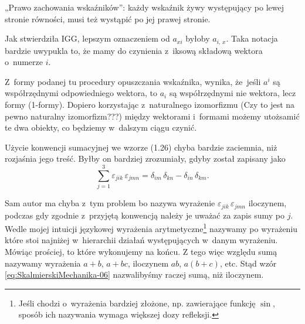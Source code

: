 \documentclass[a4paper,11pt]{article}
\begin{document}
„Prawo zachowania wskaźników”: każdy wskaźnik żywy występujący po lewej
stronie równości, musi też wystąpić po jej prawej stronie.

\vspace{\spaceFour}



 Jak stwierdziła IGG, lepszym oznaczeniem od $a_{ xi }$ byłoby
$a_{ i,\, x }$. Taka notacja bardzie uwypukla to, że mamy do czynienia
z~iksową składową wektora o~numerze $i$.

\vspace{\spaceFour}



 Z~formy podanej tu procedury opuszczania wskaźnika, wynika,
że~jeśli $a^{ i }$ są współrzędnymi odpowiedniego wektora, to $a_{ i }$ są
współrzędnymi nie wektora, lecz formy (1-formy). Dopiero korzystając
z~naturalnego izomorfizmu (Czy to jest na pewno naturalny izomorfizm???)
między wektorami i~formami możemy utożsamić te dwa obiekty, co będziemy
w~dalszym ciągu czynić.

\vspace{\spaceFour}



 Użycie konwencji sumacyjnej we wzorze (1.26) chyba bardzie zaciemnia, niż rozjaśnia jego treść. Byłby on bardziej zrozumiały, gdyby został zapisany jako
\begin{equation}
  \label{eq:SkalmierskiMechanika-06}
  \sum_{ j = 1 }^{ 3 } \varepsilon_{ j i k } \, \varepsilon_{ j m n }
  = \delta_{ i m } \, \delta_{ k n } - \delta_{ i n } \, \delta_{ k m }.
\end{equation}

Sam autor ma chyba z~tym problem bo nazywa wyrażenie
$\varepsilon_{ j i k } \, \varepsilon_{ j m n }$ iloczynem, podczas gdy zgodnie z~przyjętą
konwencją należy je uważać za zapis sumy po $j$. Wedle mojej intuicji
językowej wyrażenia arytmetyczne\footnote{Jeśli chodzi o~wyrażenia bardziej
  złożone, np. zawierające funkcję $\sin$, sposób ich nazywania wymaga
  większej dozy refleksji.} nazywamy po wyrażeniu które stoi najniżej
w~hierarchii działań występujących w~danym wyrażeniu. Mówiąc prościej,
to które wykonujemy na końcu. Z tego więc względu sumą nazywamy wyrażenia
$a + b$, $a + bc$, iloczynem $ab$, $a ( b + c )$, etc. Stąd wzór
\eqref{eq:SkalmierskiMechanika-06} nazwalibyśmy raczej sumą, niż iloczynem.
\end{document}

